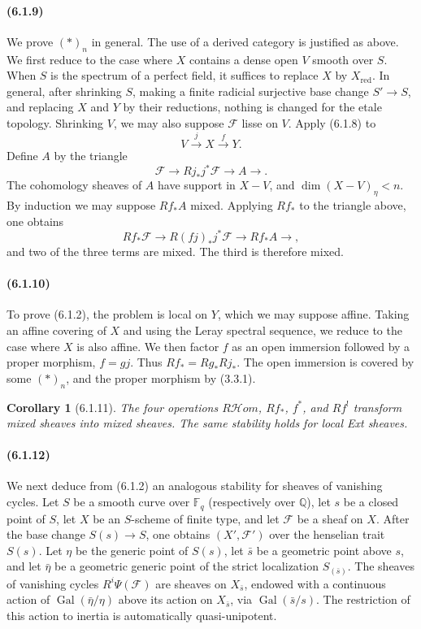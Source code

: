 \documentclass[11pt]{article}
\newtheorem{corollary}{Corollary}
\theoremstyle{remark}
\newcommand{\QQ}{\mathbb{Q}}
\newcommand{\Fq}{\mathbb{F}_q}
\begin{document}
\paragraph{(6.1.9)}
We prove \((*)_n\) in general.  The use of a derived category is justified as above.  We first reduce to the case where \(X\) contains a dense open \(V\) smooth over \(S\).  When \(S\) is the spectrum of a perfect field, it suffices to replace \(X\) by \(X_{\mathrm{red}}\).  In general, after shrinking \(S\), making a finite radicial surjective base change \(S'\to S\), and replacing \(X\) and \(Y\) by their reductions, nothing is changed for the etale topology.  Shrinking \(V\), we may also suppose \(\mathcal F\) lisse on \(V\).  Apply (6.1.8) to
\[
V\xrightarrow{j}X\xrightarrow{f}Y.
\]
Define \(A\) by the triangle
\[
\mathcal F\longrightarrow Rj_*j^*\mathcal F\longrightarrow A\longrightarrow.
\]
The cohomology sheaves of \(A\) have support in \(X-V\), and \(\dim (X-V)_\eta<n\).  By induction we may suppose \(Rf_*A\) mixed.  Applying \(Rf_*\) to the triangle above, one obtains
\[
Rf_*\mathcal F\longrightarrow R(fj)_*j^*\mathcal F\longrightarrow Rf_*A\longrightarrow,
\]
and two of the three terms are mixed.  The third is therefore mixed.

\paragraph{(6.1.10)}
To prove (6.1.2), the problem is local on \(Y\), which we may suppose affine.  Taking an affine covering of \(X\) and using the Leray spectral sequence, we reduce to the case where \(X\) is also affine.  We then factor \(f\) as an open immersion followed by a proper morphism, \(f=gj\).  Thus \(Rf_*=Rg_*Rj_*\).  The open immersion is covered by some \((*)_n\), and the proper morphism by (3.3.1).

\begin{corollary}[6.1.11]
The four operations \(R\mathcal Hom\), \(Rf_*\), \(f^*\), and \(Rf^!\) transform mixed sheaves into mixed sheaves.  The same stability holds for local Ext sheaves.
\end{corollary}

\paragraph{(6.1.12)}
We next deduce from (6.1.2) an analogous stability for sheaves of vanishing cycles.  Let \(S\) be a smooth curve over \(\Fq\) (respectively over \(\QQ\)), let \(s\) be a closed point of \(S\), let \(X\) be an \(S\)-scheme of finite type, and let \(\mathcal F\) be a sheaf on \(X\).  After the base change \(S(s)\to S\), one obtains \((X',\mathcal F')\) over the henselian trait \(S(s)\).  Let \(\eta\) be the generic point of \(S(s)\), let \(\bar s\) be a geometric point above \(s\), and let \(\bar\eta\) be a geometric generic point of the strict localization \(S_{(\bar s)}\).  The sheaves of vanishing cycles \(R^i\Psi(\mathcal F)\) are sheaves on \(X_{\bar s}\), endowed with a continuous action of \(\operatorname{Gal}(\bar\eta/\eta)\) above its action on \(X_{\bar s}\), via \(\operatorname{Gal}(\bar s/s)\).  The restriction of this action to inertia is automatically quasi-unipotent.
\end{document}
